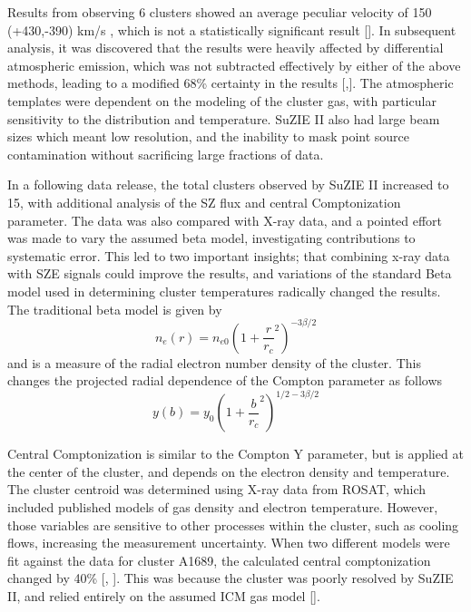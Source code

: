 \documentclass[manuscript]{aastex}
\begin{document}
Results from observing 6 clusters showed an average peculiar velocity of 150 (+430,-390) km/s , which is not a statistically significant result [\cite{Benson2003}]. In subsequent analysis, it was discovered that the results were heavily affected by differential atmospheric emission, which was not subtracted effectively by either of the above methods, leading to a modified 68\% certainty in the results [\cite{Mauskopf2000},\cite{Carlstrom2002}]. The atmospheric templates were dependent on the modeling of the cluster gas, with particular sensitivity to the distribution and temperature. SuZIE II also had large beam sizes which meant low resolution, and the inability to mask point source contamination without sacrificing large fractions of data. 

In a following data release, the total clusters observed by SuZIE II increased to 15, with additional analysis of the SZ flux and central Comptonization parameter. The data was also compared with X-ray data, and a pointed effort was made to vary the assumed beta model, investigating contributions to systematic error. This led to two important insights; that combining x-ray data with SZE signals could improve the results, and variations of the standard Beta model used in determining cluster temperatures radically changed the results. The traditional beta model is given by 
\begin{equation}
    n_{e}(r) = n_{e0}(1 + \frac{r}{r_{c}}^{2})^{-3\beta/2}
\end{equation}
and is a measure of the radial electron number density of the cluster. This changes the projected radial dependence of the Compton parameter as follows
\begin{equation}
    y(b) = y_{0}(1 + \frac{b}{r_{c}}^{2})^{1/2 - 3\beta/2}
\end{equation}

Central Comptonization is similar to the Compton Y parameter, but is applied at the center of the cluster, and depends on the electron density and temperature. The cluster centroid was determined using X-ray data from ROSAT, which included published models of gas density and electron temperature. However, those variables are sensitive to other processes within the cluster, such as cooling flows, increasing the measurement uncertainty. When two different models were fit against the data for cluster A1689, the calculated central comptonization changed by 40\% [\cite{Holzapfel1997b}, \cite{Reese2002}]. This was because the cluster was poorly resolved by SuZIE II, and relied entirely on the assumed ICM gas model [\cite{Benson2004}]. 
\end{document}
